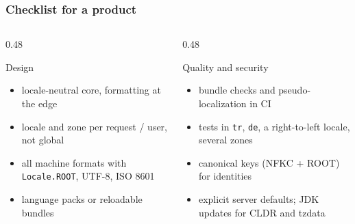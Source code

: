\documentclass[aspectratio=169,10pt,compress]{beamer}
\begin{document}
\begin{frame}[t,fragile] \frametitle{Checklist for a product}
  \begin{columns}[T]
    \begin{column}{0.48\textwidth}
      \begin{block}{Design}
        \small
        \begin{itemize}
          \item locale-neutral core, formatting at the edge
          \item locale and zone per request / user, not global
          \item all machine formats with \texttt{Locale.ROOT}, UTF-8, ISO 8601
          \item language packs or reloadable bundles
        \end{itemize}
      \end{block}
    \end{column}
    \begin{column}{0.48\textwidth}
      \begin{block}{Quality and security}
        \small
        \begin{itemize}
          \item bundle checks and pseudo-localization in CI
          \item tests in \texttt{tr}, \texttt{de}, a right-to-left locale, several zones
          \item canonical keys (NFKC + ROOT) for identities
          \item explicit server defaults; JDK updates for CLDR and tzdata
        \end{itemize}
      \end{block}
    \end{column}
  \end{columns}
\end{frame}
\end{document}
